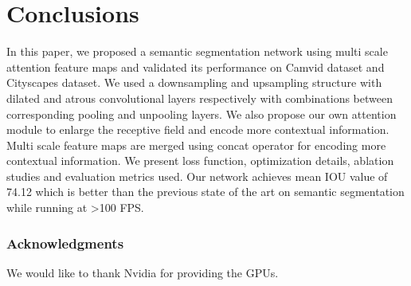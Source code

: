 \documentclass{article}
\begin{document}
\section{Conclusions}

In this paper, we proposed a semantic segmentation network using multi scale attention feature maps and validated its performance on Camvid dataset and Cityscapes dataset. We used a downsampling and upsampling structure with dilated and atrous convolutional layers respectively with combinations between corresponding pooling and unpooling layers. We also propose our own attention module to enlarge the receptive field and encode more contextual information. Multi scale feature maps are merged using concat operator for encoding more contextual information. We present loss function, optimization details, ablation studies and evaluation metrics used. Our network achieves mean IOU value of 74.12 which is better than the previous state of the art on semantic segmentation while running at >100 FPS. 

\subsubsection*{Acknowledgments}

We would like to thank Nvidia for providing the GPUs.


\end{document}
